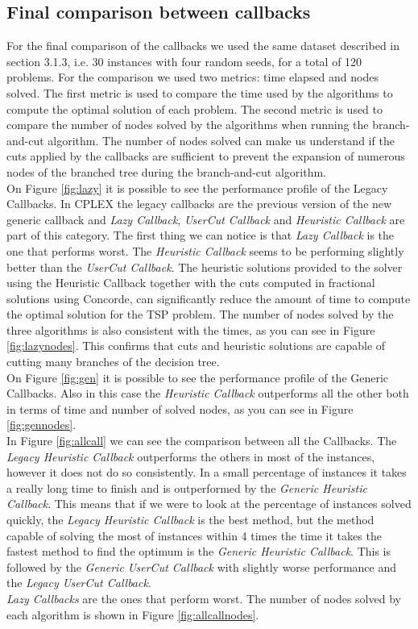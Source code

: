 \subsection{Final comparison between callbacks}
\label{callbackresults}
For the final comparison of the callbacks we used the same dataset described in section 3.1.3, i.e. 30 instances with four random seeds, for a total of 120 problems.
For the comparison we used two metrics: time elapsed and nodes solved. The first metric is used to compare the time used by the algorithms to compute the optimal solution of each problem. The second metric is used to compare the number of nodes solved by the algorithms when running the branch-and-cut algorithm. The number of nodes solved can make us understand if the cuts applied by the callbacks are sufficient to prevent the expansion of numerous nodes of the branched tree during the branch-and-cut algorithm. \\
On Figure \ref{fig:lazy} it is possible to see the performance profile of the Legacy Callbacks. In CPLEX the legacy callbacks are the previous version of the new generic callback and \textit{Lazy Callback}, \textit{UserCut Callback} and \textit{Heuristic Callback} are part of this category. The first thing we can notice is that \textit{Lazy Callback} is the one that performs worst. The \textit{Heuristic Callback} seems to be performing slightly better than the \textit{UserCut Callback}. The heuristic solutions provided to the solver using the Heuristic Callback together with the cuts computed in fractional solutions using Concorde, can significantly reduce the amount of time to compute the optimal solution for the TSP problem. The number of nodes solved by the three algorithms is also consistent with the times, as you can see in Figure \ref{fig:lazynodes}. This confirms that cuts and heuristic solutions are capable of cutting many branches of the decision tree. \\
On Figure \ref{fig:gen} it is possible to see the performance profile of the Generic Callbacks. Also in this case the \textit{Heuristic Callback} outperforms all the other both in terms of time and number of solved nodes, as you can see in Figure \ref{fig:gennodes}. \\
In Figure \ref{fig:allcall} we can see the comparison between all the Callbacks. The \textit{Legacy Heuristic Callback} outperforms the others in most of the instances, however it does not do so consistently. In a small percentage of instances it takes a really long time to finish and is outperformed by the \textit{Generic Heuristic Callback}. This means that if we were to look at the percentage of instances solved quickly, the \textit{Legacy Heuristic Callback} is the best method, but the method capable of solving the most of instances within 4 times the time it takes the fastest method to find the optimum is the \textit{Generic Heuristic Callback}. This is followed by the \textit{Generic UserCut Callback} with slightly worse performance and the \textit{Legacy UserCut Callback}.\\ \textit{Lazy Callbacks} are the ones that perform worst. The number of nodes solved by each algorithm is shown in Figure \ref{fig:allcallnodes}. \\
